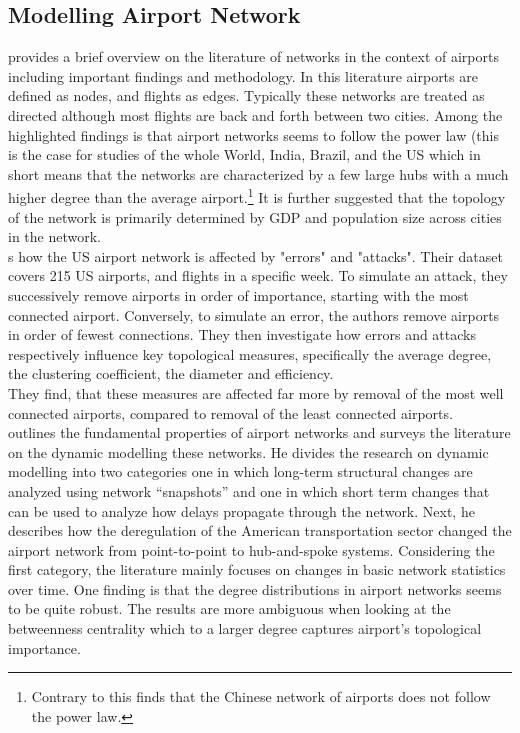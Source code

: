 \subsection{Modelling Airport Network}
\citet[pp. 41-42]{costa2011analyzing} provides a brief overview on the literature of networks in the context of airports including important findings and methodology. In this literature airports are defined as nodes, and flights as edges. Typically these networks are treated as directed although most flights are back and forth between two cities. Among the highlighted findings is that airport networks seems to follow the power law (this is the case for studies of the whole World, India, Brazil, and the US which in short means that the networks are characterized by a few large hubs with a much higher degree than the average airport.\footnote{Contrary to this \citet{he2004statistics} finds that the Chinese network of airports does not follow the power law.} It is further suggested that the topology of the network is primarily determined by GDP and population size across cities in the network. \\
\citet{chi2004structural} s how the US airport network is affected by "errors" and "attacks". Their dataset covers 215 US airports, and flights in a specific week. To simulate an attack, they successively remove airports in order of importance, starting with the most connected airport. Conversely, to simulate an error, the authors remove airports in order of fewest connections. They then investigate how errors and attacks respectively influence key topological measures, specifically the average degree, the clustering coefficient, the diameter and efficiency. \\
They find, that these measures are affected far more by removal of the most well connected airports, compared to removal of the least connected airports. \\
\citet{rocha2017dynamics} outlines the fundamental properties of airport networks and surveys the literature on the dynamic modelling these networks. He divides the research on dynamic modelling into two categories one in which long-term structural changes are analyzed using network ``snapshots'' and one in which short term changes that can be used to analyze how delays propagate through the network. Next, he describes how the deregulation of the American transportation sector changed the airport network from point-to-point to hub-and-spoke systems. Considering the first category, the literature mainly focuses on changes in basic network statistics over time. One finding is that the degree distributions in airport networks seems to be quite robust. The results are more ambiguous when looking at the betweenness centrality which to a larger degree captures airport's topological importance. 


 